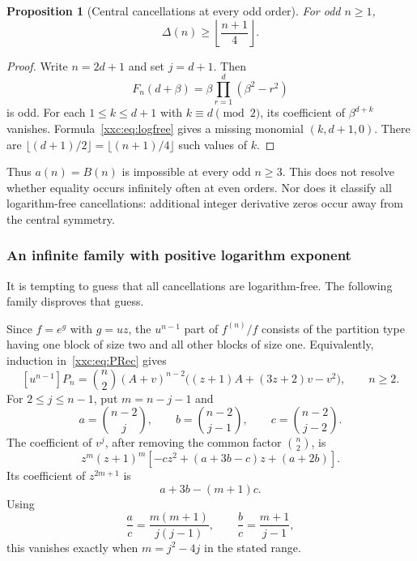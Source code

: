 \documentclass[11pt,a4paper]{article}
\numberwithin{equation}{section}
\newtheorem{proposition}[theorem]{Proposition}
\theoremstyle{definition}
\theoremstyle{remark}
\theoremstyle{plain}
\begin{document}
\begin{proposition}[Central cancellations at every odd order]\label{xxc:prop:odd}
For odd $n\ge1$,
\begin{equation}\label{xxc:eq:odddeficit}
 \Delta(n)\ge\left\lfloor\frac{n+1}{4}\right\rfloor.
\end{equation}
\end{proposition}
\begin{proof}
Write $n=2d+1$ and set $j=d+1$. Then
\[
 F_n(d+\beta)=\beta\prod_{r=1}^d(\beta^2-r^2)
\]
is odd. For each $1\le k\le d+1$ with $k\equiv d\pmod2$, its coefficient of
$\beta^{d+k}$ vanishes. Formula~\eqref{xxc:eq:logfree} gives a missing monomial
$(k,d+1,0)$. There are $\lfloor(d+1)/2\rfloor=\lfloor(n+1)/4\rfloor$ such
values of $k$.
\end{proof}

Thus $a(n)=B(n)$ is impossible at every odd $n\ge3$. This does not resolve
whether equality occurs infinitely often at even orders. Nor does it
classify all logarithm-free cancellations: additional integer derivative
zeros occur away from the central symmetry.

\subsubsection{An infinite family with positive logarithm exponent}

It is tempting to guess that all cancellations are logarithm-free.
The following family disproves that guess.

Since $f=e^g$ with $g=uz$, the $u^{n-1}$ part of $f^{(n)}/f$ consists of the
partition type having one block of size two and all other blocks of size one.
Equivalently, induction in~\eqref{xxc:eq:PRec} gives
\begin{equation}\label{xxc:eq:almosttop}
 [u^{n-1}]P_n=\binom n2(A+v)^{n-2}
 \bigl((z+1)A+(3z+2)v-v^2\bigr),\qquad n\ge2.
\end{equation}
For $2\le j\le n-1$, put $m=n-j-1$ and
\[
 a=\binom{n-2}{j},\qquad b=\binom{n-2}{j-1},\qquad
 c=\binom{n-2}{j-2}.
\]
The coefficient of $v^j$, after removing the common factor $\binom n2$, is
\begin{equation}\label{xxc:eq:quadraticrow}
 z^m(z+1)^m\left[-cz^2+(a+3b-c)z+(a+2b)\right].
\end{equation}
Its coefficient of $z^{2m+1}$ is
\begin{equation}\label{xxc:eq:nexttotop}
 a+3b-(m+1)c.
\end{equation}
Using
\[
 \frac ac=\frac{m(m+1)}{j(j-1)},\qquad
 \frac bc=\frac{m+1}{j-1},
\]
this vanishes exactly when $m=j^2-4j$ in the stated range.
\end{document}
